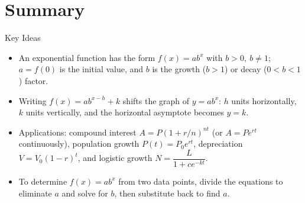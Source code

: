 \documentclass[12pt]{article}
\begin{document}
\section*{Summary}

\begin{friendlyrule}{Key Ideas}
\begin{itemize}
    \item An exponential function has the form $f(x)=ab^x$ with $b>0,\ b\neq 1$; $a=f(0)$ is the initial value, and $b$ is the growth ($b>1$) or decay ($0<b<1$) factor.
    \item Writing $f(x)=ab^{x-h}+k$ shifts the graph of $y=ab^x$: $h$ units horizontally, $k$ units vertically, and the horizontal asymptote becomes $y=k$.
    \item Applications: compound interest $A=P(1+r/n)^{nt}$ (or $A=Pe^{rt}$ continuously), population growth $P(t)=P_0e^{rt}$, depreciation $V=V_0(1-r)^t$, and logistic growth $N=\dfrac{L}{1+ce^{-kt}}$.
    \item To determine $f(x)=ab^x$ from two data points, divide the equations to eliminate $a$ and solve for $b$, then substitute back to find $a$.
\end{itemize}
\end{friendlyrule}
\end{document}
